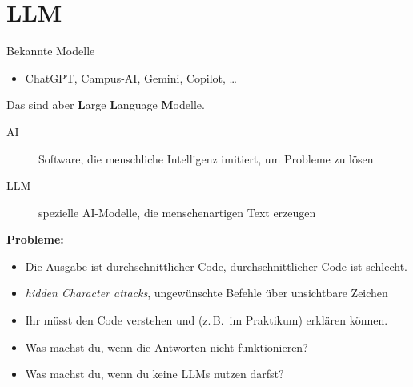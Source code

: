 \section{LLM}


\begin{frame}{Bekannte Modelle}
    \begin{itemize}
        \item ChatGPT, Campus-AI, Gemini, Copilot, \dots
    \end{itemize}
    Das sind aber \textbf{L}arge \textbf{L}anguage \textbf{M}odelle.
    \begin{description}
        \item[AI] Software, die menschliche Intelligenz imitiert, um Probleme zu lösen
        \item[LLM] spezielle AI-Modelle, die menschenartigen Text erzeugen
    \end{description}

    \textcolor{vertexDarkRed}{\textbf{Probleme:}}
    \begin{itemize}
        \item Die Ausgabe ist durchschnittlicher Code, durchschnittlicher Code ist schlecht.
        \item \textit{hidden Character attacks}, ungewünschte Befehle über unsichtbare Zeichen
        \item Ihr müsst den Code verstehen und (z.\,B.\ im Praktikum) erklären können.
        \item Was machst du, wenn die Antworten nicht funktionieren?
        \item Was machst du, wenn du keine LLMs nutzen darfst?
    \end{itemize}
\end{frame}